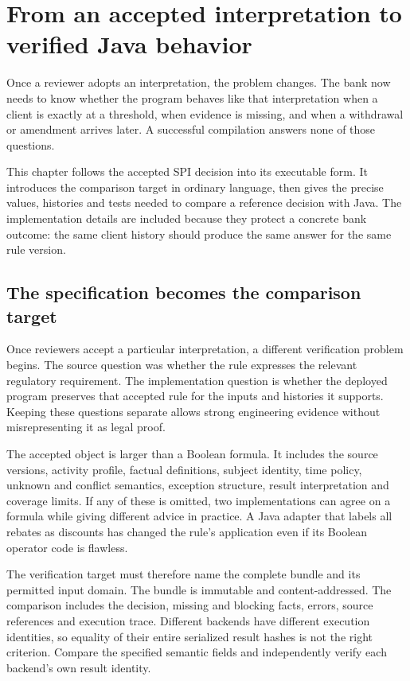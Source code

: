 \chapter{From an accepted interpretation to verified Java behavior}
\label{ch:verification}

Once a reviewer adopts an interpretation, the problem changes. The bank now
needs to know whether the program behaves like that interpretation when a client
is exactly at a threshold, when evidence is missing, and when a withdrawal or
amendment arrives later. A successful compilation answers none of those
questions.

This chapter follows the accepted SPI decision into its executable form. It
introduces the comparison target in ordinary language, then gives the precise
values, histories and tests needed to compare a reference decision with Java.
The implementation details are included because they protect a concrete bank
outcome: the same client history should produce the same answer for the same
rule version.


\section{The specification becomes the comparison target}
\label{merge:M07:00}


Once reviewers accept a particular interpretation, a different verification
problem begins. The source question was whether the rule expresses the relevant
regulatory requirement. The implementation question is whether the deployed
program preserves that accepted rule for the inputs and histories it supports.
Keeping these questions separate allows strong engineering evidence without
misrepresenting it as legal proof.

The accepted object is larger than a Boolean formula. It includes the source
versions, activity profile, factual definitions, subject identity, time policy,
unknown and conflict semantics, exception structure, result interpretation and
coverage limits. If any of these is omitted, two implementations can agree on a
formula while giving different advice in practice. A Java adapter that labels
all rebates as discounts has changed the rule's application even if its Boolean
operator code is flawless.


The verification target must therefore name the complete bundle and its
permitted input domain. The bundle is immutable and content-addressed. The
comparison includes the decision, missing and blocking facts, errors, source
references and execution trace. Different backends have different execution
identities, so equality of their entire serialized result hashes is not the
right criterion. Compare the specified semantic fields and independently verify
each backend's own result identity.

